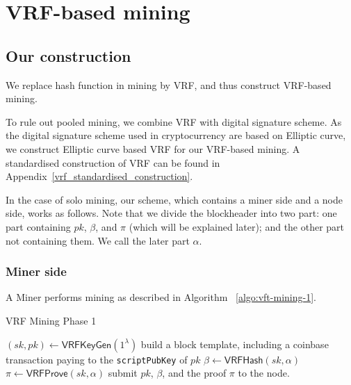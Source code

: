 \section{VRF-based mining}

\subsection{Our construction}

We replace hash function in mining by VRF, and thus construct VRF-based mining.

To rule out pooled mining, we combine VRF with digital signature scheme.
As the digital signature scheme used in cryptocurrency are based on Elliptic curve, we construct Elliptic curve based VRF for our VRF-based mining.
A standardised construction of VRF can be found in Appendix~\ref{vrf_standardised_construction}.




In the case of solo mining, our scheme, which contains a miner side and a node side, works as follows. Note that we divide the blockheader into two part:
one part containing $pk$, $\beta$, and $\pi$ (which will be explained later);
and the other part not containing them.
We call the later part $\alpha$.

\subsubsection{Miner side\\}

A Miner performs mining as described in Algorithm ~\ref{algo:vft-mining-1}.


\begin{algorithm}[H]
\caption{VRF Mining Phase 1}
\label{algo:vft-mining-1}
\SetAlgoLined
  $(sk, pk) \gets \mathsf{VRFKeyGen}(1^{\lambda})$\;
  build a block template, including a coinbase transaction paying to the \texttt{scriptPubKey} of $pk$\;
  $\beta \gets \mathsf{VRFHash}(sk, \alpha)$\;
  $\pi \gets \mathsf{VRFProve}(sk, \alpha)$\;
  submit $pk$, $\beta$, and the proof $\pi$ to the node.
\end{algorithm}

